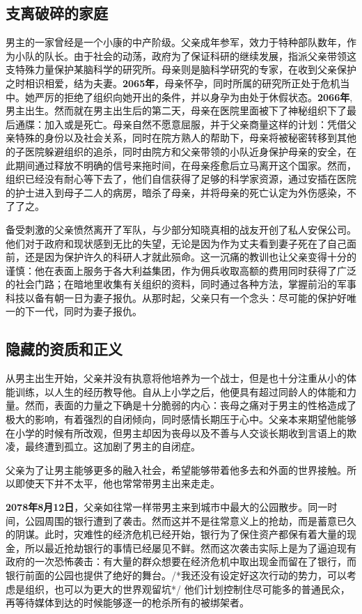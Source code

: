 \documentclass[12pt, a4paper]{article}
\begin{document}
    \subsection*{支离破碎的家庭}
        
    男主的一家曾经是一个小康的中产阶级。父亲成年参军，效力于特种部队数年，作为小队的队长。由于社会的动荡，政府为了保证科研的继续发展，指派父亲带领这支特殊力量保护某脑科学的研究所。母亲则是脑科学研究的专家，在收到父亲保护之时相识相爱，结为夫妻。\textbf{2065年}，母亲怀孕，同时所属的研究所正处于危机当中。她严厉的拒绝了组织向她开出的条件，并以身孕为由处于休假状态。\textbf{2066年},男主出生。然而就在男主出生后的第二天，母亲在医院里面被下了神秘组织下了最后通牒：加入或是死亡。母亲自然不愿意屈服，并于父亲商量这样的计划：凭借父亲特殊的身份以及社会关系，同时在院方熟人的帮助下，母亲将被秘密转移到其他的子医院躲避组织的追杀，同时由院方和父亲带领的小队近身保护母亲的安全，在此期间通过释放不明确的信号来拖时间，在母亲痊愈后立马离开这个国家。然而，组织已经没有耐心等下去了，他们自信获得了足够的科学家资源，通过安插在医院的护士进入到母子二人的病房，暗杀了母亲，并将母亲的死亡认定为外伤感染，不了了之。

    备受刺激的父亲愤然离开了军队，与少部分知晓真相的战友开创了私人安保公司。他们对于政府和现状感到无比的失望，无论是因为作为丈夫看到妻子死在了自己面前，还是因为保护许久的科研人才就此殒命。这一沉痛的教训也让父亲变得十分的谨慎：他在表面上服务于各大利益集团，作为佣兵收取高额的费用同时获得了广泛的社会门路；在暗地里收集有关组织的资料，同时通过各种方法，掌握前沿的军事科技以备有朝一日为妻子报仇。从那时起，父亲只有一个念头：尽可能的保护好唯一的下一代，同时为妻子报仇。

    \subsection*{隐藏的资质和正义}  
        从男主出生开始，父亲并没有执意将他培养为一个战士，但是也十分注重从小的体能训练，以人生的经历教导他。自从上小学之后，他便具有超过同龄人的体能和力量。然而，表面的力量之下确是十分脆弱的内心：丧母之痛对于男主的性格造成了极大的影响，有着强烈的自闭倾向，同时感情长期压于心中。父亲本来期望他能够在小学的时候有所改观，但男主却因为丧母以及不善与人交谈长期收到言语上的欺凌，最终遭到孤立。这加剧了男主的自闭症。

        父亲为了让男主能够更多的融入社会，希望能够带着他多去和外面的世界接触。所以即使天下并不太平，他也常常带男主出来走走。

        \textbf{2078年8月12日}，父亲如往常一样带男主来到城市中最大的公园散步。同一时间，公园周围的银行遭到了袭击。然而这并不是往常意义上的抢劫，而是蓄意已久的阴谋。此时，灾难性的经济危机已经开始，银行为了保住资产都保有着大量的现金，所以最近抢劫银行的事情已经屡见不鲜。然而这次袭击实际上是为了逼迫现有政府的一次恐怖袭击：有大量的群众想要在经济危机中取出现金而留在了银行，而银行前面的公园也提供了绝好的舞台。/*我还没有设定好这次行动的势力，可以考虑是组织，也可以为更大的世界观留坑*/ 他们计划控制住尽可能多的普通民众，再等待媒体到达的时候能够逐一的枪杀所有的被绑架者。
\end{document}

